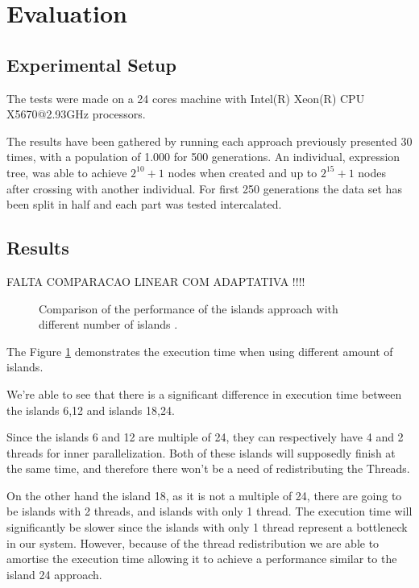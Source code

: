 \documentclass[runningheads]{llncs}
\begin{document}
\section{Evaluation}

\subsection{Experimental Setup}
The tests were made on a 24 cores machine with Intel(R) Xeon(R) CPU X5670@2.93GHz processors.

The results have been gathered by running each approach previously presented 30 times, with a population of 1.000 for 500 generations. An individual, expression tree, was able to achieve \(2^{10} + 1\) nodes when created and up to \(2^{15} + 1\) nodes after crossing with another individual. For first 250 generations the data set has been split in half and each part was tested intercalated.

\subsection{Results}

FALTA COMPARACAO LINEAR COM ADAPTATIVA !!!!

\begin{figure}[H]
\centering
{}
\caption{Comparison of the performance of the islands approach with different number of islands .} \label{comparacaoilhas}
\end{figure}

The Figure \ref{comparacaoilhas} demonstrates the execution time when using different amount of islands.

We're able to see that there is a significant difference in execution time between the islands 6,12 and islands 18,24. 

Since the islands 6 and 12 are multiple of 24, they can respectively have 4 and 2 threads for inner parallelization. Both of these islands will supposedly finish at the same time, and therefore there won't be a need of redistributing the Threads.

On the other hand the island 18, as it is not a multiple of 24, there are going to be islands with 2 threads, and islands with only 1 thread. The execution time will significantly be slower since the islands with only 1 thread represent a bottleneck in our system. However, because of the thread redistribution we are able to amortise the execution time allowing it to achieve a performance similar to the island 24 approach.
\end{document}
